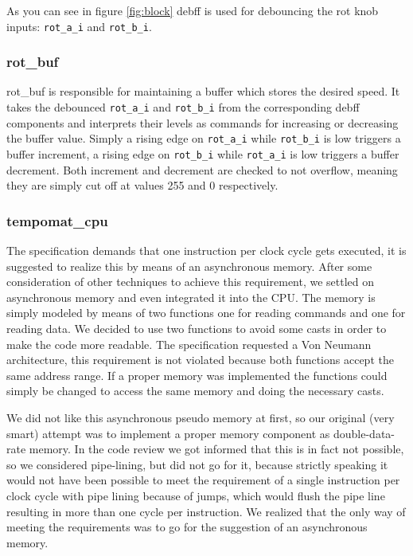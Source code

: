\documentclass[a4paper,10pt]{scrartcl}
\begin{document}
As you can see in figure \ref{fig:block} debff is used for debouncing the rot knob inputs: \texttt{rot\_a\_i} and \texttt{rot\_b\_i}.

\subsubsection{rot\_buf}
\label{sec:rot_buf}

rot\_buf is responsible for maintaining a buffer which stores the
desired speed. It takes the debounced \texttt{rot\_a\_i} and
\texttt{rot\_b\_i} from the corresponding debff components and
interprets their levels as commands for increasing or decreasing the
buffer value. Simply a rising edge on \texttt{rot\_a\_i} while
\texttt{rot\_b\_i} is low triggers a buffer increment, a rising edge on
\texttt{rot\_b\_i} while \texttt{rot\_a\_i} is low triggers a buffer
decrement. Both increment and decrement are checked to not overflow,
meaning they are simply cut off at values 255 and 0 respectively.

\subsubsection{tempomat\_cpu}
\label{sec:tempomat_cpu}
The specification demands that one instruction per clock cycle gets
executed, it is suggested to realize this by means of an asynchronous
memory. After some consideration of other techniques to achieve this
requirement, we settled on asynchronous memory and even integrated it
into the CPU. The memory is simply modeled by means of two functions
one for reading commands and one for reading data. We decided to use
two functions to avoid some casts in order to make the code more
readable. The specification requested a Von Neumann architecture, this
requirement is not violated because both functions accept the same
address range. If a proper memory was implemented the functions could
simply be changed to access the same memory and doing the necessary
casts.

We did not like this asynchronous pseudo memory at first, so our
original (very smart) attempt was to implement a proper memory component
as double-data-rate memory. In the code review we got informed that
this is in fact not possible, so we considered pipe-lining, but did
not go for it, because strictly speaking it would not have been
possible to meet the requirement of a single instruction per clock
cycle with pipe lining because of jumps, which would flush the pipe
line resulting in more than one cycle per instruction. We realized
that the only way of meeting the requirements was to go for the
suggestion of an asynchronous memory.
\end{document}
